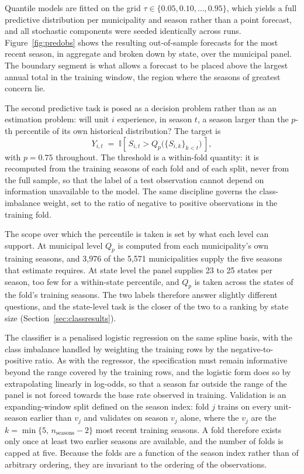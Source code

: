 \documentclass[english,10pt,b5paper]{article}
\begin{document}
Quantile models are fitted on the grid $\tau \in \{0.05, 0.10, \dots, 0.95\}$,
which yields a full predictive distribution per municipality and season rather
than a point forecast, and all stochastic components were seeded identically
across runs. Figure~\ref{fig:predobs} shows the resulting out-of-sample
forecasts for the most recent season, in aggregate and broken down by state,
over the municipal panel. The boundary segment is what allows a forecast to be
placed above the largest annual total in the training window, the region where
the seasons of greatest concern lie.

The second predictive task is posed as a decision problem rather than as an
estimation problem: will unit $i$ experience, in season $t$, a season larger than
the $p$-th percentile of its own historical distribution? The target is
%
\begin{equation}
Y_{i,t} \;=\; \mathbb{I}\!\left[\,S_{i,t} > Q_p\big(\{S_{i,k}\}_{k<t}\big)\,\right],
\label{eq:label}
\end{equation}
%
with $p=0.75$ throughout. The threshold is a within-fold quantity: it is
recomputed from the training seasons of each fold and of each split, never from
the full sample, so that the label of a test observation cannot depend on
information unavailable to the model. The same discipline governs the
class-imbalance weight, set to the ratio of negative to positive observations in
the training fold.

The scope over which the percentile is taken is set by what each level can support.
At municipal level $Q_p$ is computed from each municipality's own training seasons, and
3{,}976 of the 5{,}571 municipalities supply the five seasons that estimate requires.
At state level the panel supplies 23 to 25 states per season, too few for a within-state
percentile, and $Q_p$ is taken across the states of the fold's training seasons. The
two labels therefore answer slightly different questions, and the state-level task is
the closer of the two to a ranking by state size (Section~\ref{sec:classresults}).

The classifier is a penalised logistic regression on the same spline basis,
with the class imbalance handled by weighting the training rows by the
negative-to-positive ratio. As with the regressor, the specification must
remain informative beyond the range covered by the training rows, and the
logistic form does so by extrapolating linearly in log-odds, so that a season
far outside the range of the panel is not forced towards the base rate
observed in training. Validation is an expanding-window split defined on the
season index: fold $j$ trains on every unit-season earlier than $v_j$ and
validates on season $v_j$ alone, where the $v_j$ are the $k=\min\{5,\,
n_{\text{seasons}}-2\}$ most recent training seasons. A fold therefore exists
only once at least two earlier seasons are available, and the number of folds
is capped at five. Because the folds are a function of the season index rather
than of arbitrary ordering, they are invariant to the ordering of the
observations.
\end{document}
